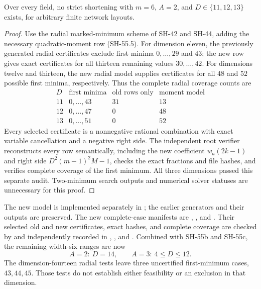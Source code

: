 \begin{theorem}
\label{thm:width-six-moment-eleven-thirteen}
Over every field, no strict shortening with $m=6$,
$A=2$, and $D\in\{11,12,13\}$ exists, for arbitrary
finite network layouts.
\end{theorem}
\begin{proof}
Use the radial marked-minimum scheme of SH-42 and
SH-44, adding the necessary quadratic-moment row
(SH-55.5).  For dimension eleven, the previously
generated radial certificates exclude first minima
$0,\ldots,29$ and $43$; the new row gives exact
certificates for all thirteen remaining values
$30,\ldots,42$.  For dimensions twelve and thirteen,
the new radial model supplies certificates for all
$48$ and $52$ possible first minima, respectively.
Thus the complete radial coverage counts are
\[
\begin{array}{c|c|c|c}
 D&\text{first minima}&\text{old rows only}&
                   \text{moment model}\\\hline
 11&0,\ldots,43&31&13\\
 12&0,\ldots,47&0&48\\
 13&0,\ldots,51&0&52
\end{array}
\]
Every selected certificate is a nonnegative rational
combination with exact variable cancellation and a
negative right side.  The independent root verifier
reconstructs every row semantically, including the
new coefficient $w_a(2k-1)$ and right side
$D^2(m-1)^2M-1$, checks the exact fractions and file
hashes, and verifies complete coverage of the first
minimum.  All three dimensions passed this separate
audit.  Two-minimum search outputs and numerical
solver statuses are unnecessary for this proof.
\end{proof}

The new model is implemented separately in
;
the earlier generators and their outputs are preserved.
The new complete-case manifests are
,
, and
.
Their selected old and new certificates, exact hashes,
and complete coverage are checked by
and independently recorded in
,
, and
.
Combined with SH-55b and SH-55c, the remaining
width-six ranges are now
\[
             A=2:\ D=14,
             \qquad A=3:\ 4\leq D\leq12.
\]
The dimension-fourteen radial tests leave three
uncertified first-minimum cases, $43,44,45$.
Those tests do not establish either feasibility or
an exclusion in that dimension.

